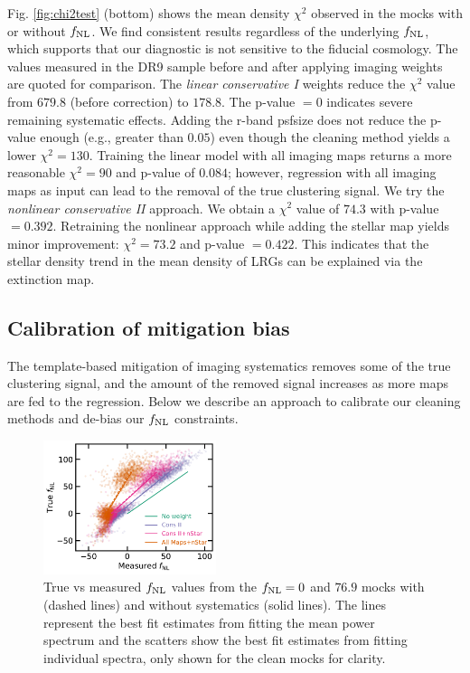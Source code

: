Fig. \ref{fig:chi2test} (bottom) shows the mean density $\chi^{2}$ observed in the mocks with or without $f_{\rm NL}$. We find consistent results regardless of the underlying $f_{\rm NL}$, which supports that our diagnostic is not sensitive to the fiducial cosmology. The values measured in the DR9 sample before and after applying imaging weights are quoted for comparison. The \textit{linear conservative I} weights reduce the $\chi^{2}$ value from $679.8$ (before correction) to $178.8$. The p-value $=0$ indicates severe remaining systematic effects. Adding the r-band psfsize does not reduce the p-value enough (e.g., greater than $0.05$) even though the cleaning method yields a lower $\chi^{2}=130$. Training the linear model with all imaging maps returns a more reasonable $\chi^{2}=90$ and p-value of $0.084$; however, regression with all imaging maps as input can lead to the removal of the true clustering signal. We try the \textit{nonlinear conservative II} approach. We obtain a $\chi^{2}$ value of $74.3$ with p-value $=0.392$. Retraining the nonlinear approach while adding the stellar map yields minor improvement: $\chi^{2}=73.2$ and p-value $=0.422$.  This indicates that the stellar density trend in the mean density of LRGs can be explained via the extinction map.


\subsection{Calibration of mitigation bias}
The template-based mitigation of imaging systematics removes some of the true clustering signal, and the amount of the removed signal increases as more maps are fed to the regression. Below we describe an approach to calibrate our cleaning methods and de-bias our $f_{\rm NL}$ constraints. 

\begin{figure}
\centering
\includegraphics[width=0.45\textwidth]{figures/fnlbias}
\caption{True vs measured $f_{\rm NL}$ values from the $f_{\rm NL}=0$ and $76.9$ mocks with (dashed lines) and without systematics (solid lines). The lines represent the best fit estimates from fitting the mean power spectrum and the scatters show the best fit estimates from fitting individual spectra, only shown for the clean mocks for clarity.}\label{fig:fnlbias}
\end{figure}

